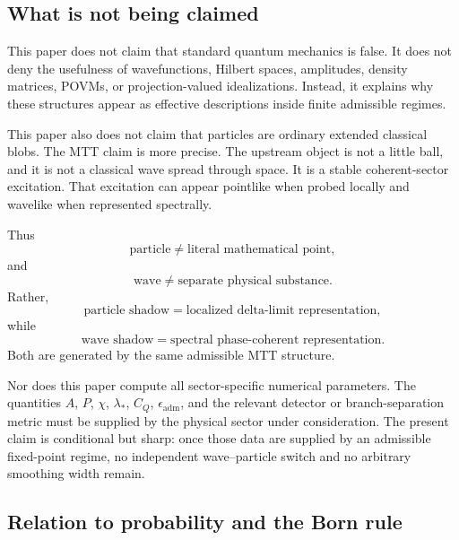 \documentclass[11pt]{article}
\newcommand{\epsadm}{\epsilon_{\mathrm{adm}}}
\begin{document}
\subsection{What is not being claimed}
\label{subsec:not-claimed}

This paper does not claim that standard quantum mechanics is false. It does not deny the
usefulness of wavefunctions, Hilbert spaces, amplitudes, density matrices, POVMs, or
projection-valued idealizations. Instead, it explains why these structures appear as effective
descriptions inside finite admissible regimes.

This paper also does not claim that particles are ordinary extended classical blobs. The MTT
claim is more precise. The upstream object is not a little ball, and it is not a classical wave
spread through space. It is a stable coherent-sector excitation. That excitation can appear
pointlike when probed locally and wavelike when represented spectrally.

Thus
\begin{equation}
  \text{particle}\neq \text{literal mathematical point},
\end{equation}
and
\begin{equation}
  \text{wave}\neq \text{separate physical substance}.
\end{equation}
Rather,
\begin{equation}
  \text{particle shadow}
  =
  \text{localized delta-limit representation},
\end{equation}
while
\begin{equation}
  \text{wave shadow}
  =
  \text{spectral phase-coherent representation}.
\end{equation}
Both are generated by the same admissible MTT structure.

Nor does this paper compute all sector-specific numerical parameters. The quantities
\(A\), \(P\), \(\chi\), \(\lambda_\ast\), \(C_Q\), \(\epsadm\), and the relevant detector or
branch-separation metric must be supplied by the physical sector under consideration. The
present claim is conditional but sharp: once those data are supplied by an admissible
fixed-point regime, no independent wave--particle switch and no arbitrary smoothing width
remain.

\subsection{Relation to probability and the Born rule}
\label{subsec:born-relation}
\end{document}

